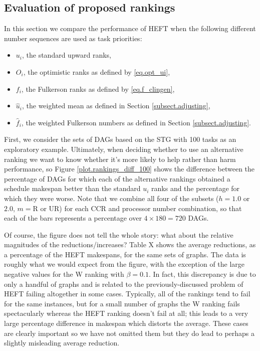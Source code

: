 \documentclass[12pt]{article}
\begin{document}
\subsection{Evaluation of proposed rankings}
\label{subsect.evaluation}

In this section we compare the performance of HEFT when the following different number sequences are used as task priorities:
\begin{itemize}
	\item $u_i$, the standard upward ranks,
	\item $O_i$, the optimistic ranks as defined by \eqref{eq.opt_ui},
	\item $f_i$, the Fulkerson ranks as defined by \eqref{eq.f_clingen},
	\item $\hat{u}_i$, the weighted mean as defined in Section \ref{subsect.adjusting},
	\item $\hat{f}_i$, the weighted Fulkerson numbers as defined in Section \ref{subsect.adjusting}.
\end{itemize}
First, we consider the sets of DAGs based on the STG with 100 tasks as an exploratory example. Ultimately, when deciding whether to use an alternative ranking we want to know whether it's more likely to help rather than harm performance, so Figure \ref{plot.rankings_diff_100} shows the difference between the percentage of DAGs for which each of the alternative rankings obtained a schedule makespan better than the standard $u_i$ ranks and the percentage for which they were worse. Note that we combine all four of the subsets ($h = 1.0$ or $2.0$, $m = \text{R}$ or UR) for each CCR and processor number combination, so that each of the bars represents a percentage over $4 \times 180 = 720$ DAGs. 

Of course, the figure does not tell the whole story: what about the relative magnitudes of the reductions/increases? Table X shows the average reductions, as a percentage of the HEFT makespans, for the same sets of graphs. The data is roughly what we would expect from the figure, with the exception of the large negative values for the W ranking with $\beta = 0.1$. In fact, this discrepancy is due to only a handful of graphs and is related to the previously-discussed problem of HEFT failing altogether in some cases. Typically, all of the rankings tend to fail for the same instances, but for a small number of graphs the W ranking fails spectacularly whereas the HEFT ranking doesn't fail at all; this leads to a very large percentage difference in makespan which distorts the average. These cases are clearly important so we have not omitted them but they do lead to perhaps a slightly misleading average reduction.     
\end{document}

